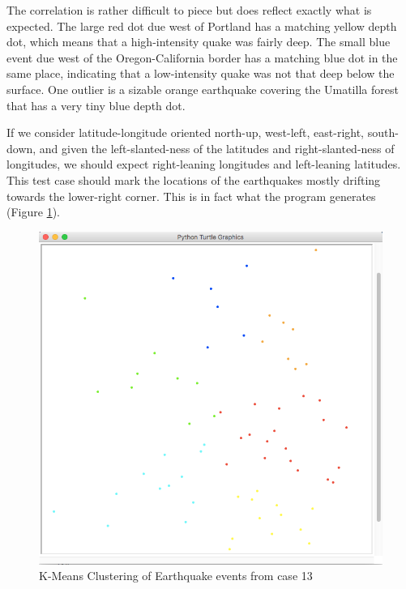 The correlation is rather difficult to piece but does reflect exactly what is expected. The large red dot due west of Portland has a matching yellow depth dot, which means that a high-intensity quake was fairly deep. The small blue event due west of the Oregon-California border has a matching blue dot in the same place, indicating that a low-intensity quake was not that deep below the surface. One outlier is a sizable orange earthquake covering the Umatilla forest that has a very tiny blue depth dot.

If we consider latitude-longitude oriented north-up, west-left, east-right, south-down, and given the left-slanted-ness of the latitudes and right-slanted-ness of longitudes, we should expect right-leaning longitudes and left-leaning latitudes. This test case should mark the locations of the earthquakes mostly drifting towards the lower-right corner. This is in fact what the program generates (Figure \ref{fig:clusters}).

\begin{figure}[!h]
\centering
\includegraphics[scale=0.6]{clusters-nobg.png}
\caption{K-Means Clustering of Earthquake events from case 13}
\label{fig:clusters}
\end{figure}
